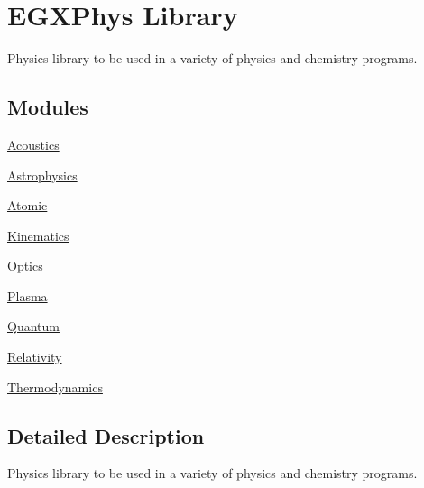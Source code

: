 \hypertarget{group___e_g_x_phys}{}\section{E\+G\+X\+Phys Library}
\label{group___e_g_x_phys}


Physics library to be used in a variety of physics and chemistry programs.  


\subsection*{Modules}
\begin{DoxyCompactItemize}
\item 
\mbox{\hyperlink{group___e_g_x_phys-_acoustics}{Acoustics}}
\item 
\mbox{\hyperlink{group___e_g_x_phys-_astrophysics}{Astrophysics}}
\item 
\mbox{\hyperlink{group___e_g_x_phys-_atomic}{Atomic}}
\item 
\mbox{\hyperlink{group___kinematics}{Kinematics}}
\item 
\mbox{\hyperlink{group___e_g_x_phys-_optics}{Optics}}
\item 
\mbox{\hyperlink{group___e_g_x_phys-_plasma}{Plasma}}
\item 
\mbox{\hyperlink{group___e_g_x_phys-_quantum}{Quantum}}
\item 
\mbox{\hyperlink{group___e_g_x_phys-_relativity}{Relativity}}
\item 
\mbox{\hyperlink{group___e_g_x_phys-_thermodynamics}{Thermodynamics}}
\end{DoxyCompactItemize}


\subsection{Detailed Description}
Physics library to be used in a variety of physics and chemistry programs. 

